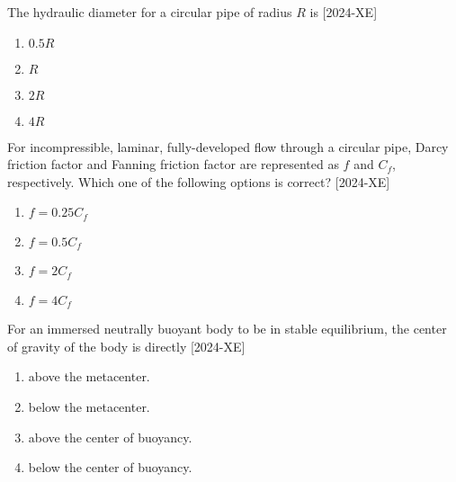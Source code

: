 \iffalse
    \title{Assignment}
    \author{EE24BTECH11066}
    \section{xe}
    \chapter{2024}
  \fi
\item The hydraulic diameter for a circular pipe of radius $R$ is \hfill{[2024-XE]}\\
\begin{enumerate}
    \item $0.5R$\\
    \item $R$\\
    \item $2R$\\
    \item $4R$\\
\end{enumerate}

\item For incompressible, laminar, fully-developed flow through a circular pipe, Darcy friction factor and Fanning friction factor are represented as $f$ and $C_{f}$, respectively. Which one of the following options is correct? \hfill{[2024-XE]}\\
\begin{enumerate}
    \item $f=0.25 C_{f}$\\
    \item $f=0.5 C_{f}$\\
    \item $f=2 C_{f}$\\
    \item $f=4 C_{f}$\\
\end{enumerate}

\item For an immersed neutrally buoyant body to be in stable equilibrium, the center of gravity of the body is directly \hfill{[2024-XE]}\\
\begin{enumerate}
    \item above the metacenter.\\
    \item below the metacenter.\\
    \item above the center of buoyancy.\\
    \item below the center of buoyancy.\\
\end{enumerate}

